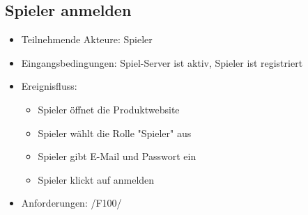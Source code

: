 \documentclass[a4paper]{scrreprt}
\begin{document}
    \subsection{Spieler anmelden}
    \begin{itemize}
        \item Teilnehmende Akteure: \Gls{Spieler}
        \item Eingangsbedingungen: Spiel-Server ist aktiv, Spieler ist registriert
        \item Ereignisfluss:
        \begin{itemize}
            \item \Gls{Spieler} öffnet die Produktwebsite
            \item \Gls{Spieler} wählt die Rolle "\Gls{Spieler}" aus
            \item \Gls{Spieler} gibt E-Mail und Passwort ein
            \item \Gls{Spieler} klickt auf anmelden
        \end{itemize}
        \item Anforderungen: /F100/
    \end{itemize}

\end{document}
